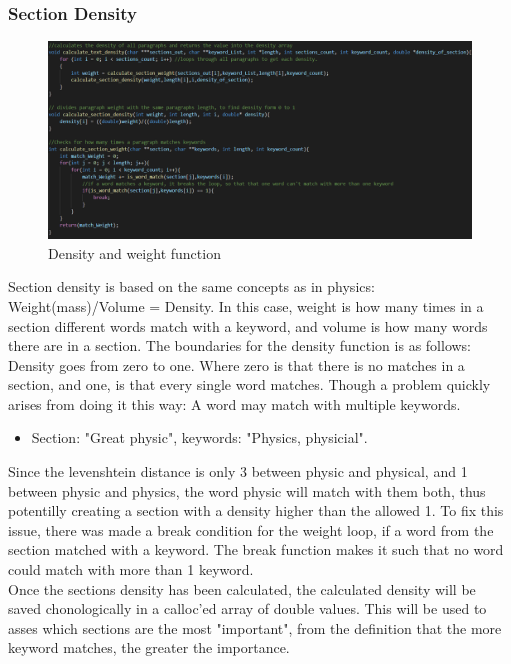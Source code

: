 \subsubsection{Section Density}
\begin{figure}[H]
  \centering
  \includegraphics[scale = 0.6]{figures/section_density}
  \caption{Density and weight function}
\end{figure}
Section density is based on the same concepts as in physics: Weight(mass)/Volume = Density.
In this case, weight is how many times in a section different words match with a keyword, and volume is how many words there
are in a section. The boundaries for the density function is as follows: Density goes from zero to one. 
Where zero is that there is no matches in a section, and one, is that every single word matches. Though a problem quickly arises
from doing it this way: A word may match with multiple keywords.\\
\begin{itemize}
  \item Section: "Great physic", keywords: "Physics, physicial".
\end{itemize}
Since the levenshtein distance is only 3 between physic and physical, and 1 between physic and physics,
the word physic will match with them both, thus potentilly creating a section with a density higher than the allowed 1.
To fix this issue, there was made a break condition for the weight loop, if a word from the section matched with a keyword.
The break function makes it such that no word could match with more than 1 keyword.
\\
Once the sections density has been calculated, the calculated density will be saved chonologically in a calloc'ed array of double values. 
This will be used to asses which sections are the most "important", from the definition that the more keyword matches, the greater the importance.
\\
